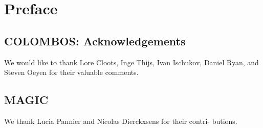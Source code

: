 \chapter*{Preface}                                  \label{ch:preface}


\instructionspreface




\section{COLOMBOS: Acknowledgements}
We would like to thank Lore Cloots, Inge Thijs, Ivan Ischukov, Daniel Ryan, and 
Steven Oeyen for their valuable comments. 

\section{MAGIC}
We thank Lucia Pannier and Nicolas Dierckxsens for their contri-
butions.

\cleardoublepage

